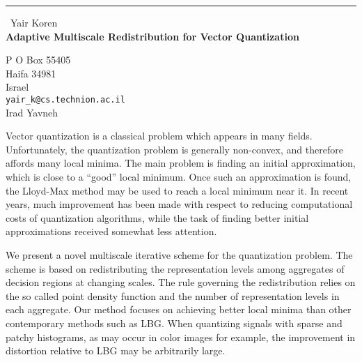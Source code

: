 \documentclass{report}
\begin{document}
\begin{center}
\rule{6in}{1pt} \
{\large Yair Koren \\
{\bf Adaptive Multiscale Redistribution for Vector Quantization}}

P O Box 55405 \\ Haifa 34981 \\ Israel
\\
{\tt yair_k@cs.technion.ac.il}\\
Irad Yavneh\end{center}

Vector quantization is a classical problem which appears in many
fields. Unfortunately, the quantization problem is generally
non-convex, and therefore affords many local minima. The main
problem is finding an initial approximation, which is close to a
``good'' local minimum. Once such an approximation is found, the
Lloyd-Max method may be used to reach a local minimum near it. In
recent years, much improvement has been made with respect to
reducing computational costs of quantization algorithms, while the
task of finding better initial approximations received somewhat
less attention.

We present a novel multiscale iterative scheme for
the quantization problem. The scheme is based on redistributing
the representation levels among aggregates of decision regions at
changing scales. The rule governing the redistribution relies on
the so called point density function and the number of
representation levels in each aggregate. Our method focuses on
achieving better local minima than other contemporary methods such
as LBG. When quantizing signals with sparse and patchy histograms,
as may occur in color images for example, the improvement in
distortion relative to LBG may be arbitrarily large.
\end{document}

